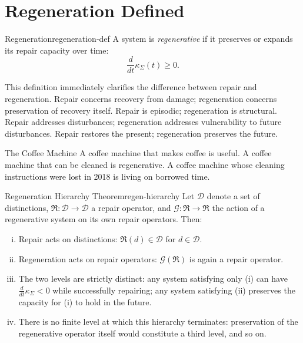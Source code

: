 \documentclass[12pt,twoside,openright]{book}
\newcommand{\repair}{\mathfrak{R}}
\begin{document}
\section{Regeneration Defined}
\label{sec:ch11-defined}

\begin{definition}{Regeneration}{regeneration-def}
  A system is \emph{regenerative} if it preserves or
  expands its repair capacity over time:
  \[
    \frac{d}{dt}\kappa_\Sigma(t) \ge 0.
  \]
\end{definition}

This definition immediately clarifies the difference
between repair and regeneration. Repair concerns recovery
from damage; regeneration concerns preservation of recovery
itself. Repair is episodic; regeneration is structural.
Repair addresses disturbances; regeneration addresses
vulnerability to future disturbances. Repair restores the
present; regeneration preserves the future.

\begin{distinctionaside}{The Coffee Machine}
A coffee machine that makes coffee is useful. A coffee
machine that can be cleaned is regenerative. A coffee machine
whose cleaning instructions were lost in 2018 is living on
borrowed time.
\end{distinctionaside}

\begin{theorem}{Regeneration Hierarchy Theorem}{regen-hierarchy}
  Let $\mathcal{D}$ denote a set of distinctions,
  $\repair : \mathcal{D} \to \mathcal{D}$ a repair operator,
  and $\mathcal{G} : \repair \to \repair$ the action of a
  regenerative system on its own repair operators. Then:
  \begin{enumerate}[(i)]
    \item Repair acts on distinctions:
          $\repair(d) \in \mathcal{D}$ for $d \in \mathcal{D}$.
    \item Regeneration acts on repair operators:
          $\mathcal{G}(\repair)$ is again a repair operator.
    \item The two levels are strictly distinct: any
          system satisfying only (i) can have
          $\frac{d}{dt}\kappa_\Sigma < 0$ while
          successfully repairing; any system satisfying (ii)
          preserves the capacity for (i) to hold in the
          future.
    \item There is no finite level at which this hierarchy
          terminates: preservation of the regenerative
          operator itself would constitute a third level,
          and so on.
  \end{enumerate}
\end{theorem}
\end{document}
